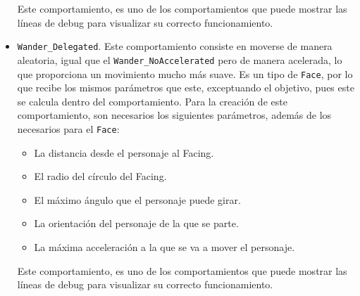 \begin{itemize}
 Este comportamiento, es uno de los comportamientos que puede mostrar las líneas de debug para visualizar su correcto funcionamiento. 

 
 \item \texttt{Wander\_Delegated}. Este comportamiento consiste en moverse de manera aleatoria, igual que el \texttt{Wander\_NoAccelerated} pero de manera acelerada, lo que proporciona un movimiento mucho más suave. Es un tipo de \texttt{Face}, por lo que recibe los mismos parámetros que este, exceptuando el objetivo, pues este se calcula dentro del comportamiento. Para la creación de este comportamiento, son necesarios los siguientes parámetros, además de los necesarios para el \texttt{Face}:
 \begin{itemize}
  \item La distancia desde el personaje al Facing.
  \item El radio del círculo del Facing.
  \item El máximo ángulo que el personaje puede girar.
  \item La orientación del personaje de la que se parte.
  \item La máxima acceleración a la que se va a mover el personaje.
 \end{itemize}
 Este comportamiento, es uno de los comportamientos que puede mostrar las líneas de debug para visualizar su correcto funcionamiento. 

\end{itemize}

\medskip

